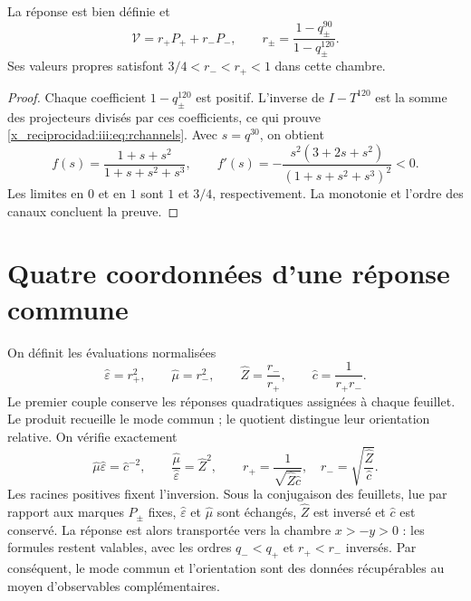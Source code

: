 \begin{proposition}
La réponse est bien définie et
\begin{equation}
 \mathcal V=r_+P_++r_-P_-,\qquad
 r_\pm=\frac{1-q_\pm^{90}}{1-q_\pm^{120}}.
 \label{x_reciprocidad:iii:eq:rchannels}
\end{equation}
Ses valeurs propres satisfont $3/4<r_-<r_+<1$ dans cette chambre.
\end{proposition}
\begin{proof}
Chaque coefficient $1-q_\pm^{120}$ est positif. L'inverse de $I-T^{120}$ est la somme des projecteurs divisés par ces coefficients, ce qui prouve \eqref{x_reciprocidad:iii:eq:rchannels}. Avec $s=q^{30}$, on obtient
\begin{equation}
 f(s)=\frac{1+s+s^2}{1+s+s^2+s^3},\qquad
 f'(s)=-\frac{s^2(3+2s+s^2)}{(1+s+s^2+s^3)^2}<0.
 \label{x_reciprocidad:iii:eq:monotone}
\end{equation}
Les limites en $0$ et en $1$ sont $1$ et $3/4$, respectivement. La monotonie
et l’ordre des canaux concluent la preuve.
\end{proof}

\section{Quatre coordonnées d’une réponse commune}

On définit les évaluations normalisées
\begin{equation}
 \widehat\varepsilon=r_+^2,\qquad
 \widehat\mu=r_-^2,\qquad
 \widehat Z=\frac{r_-}{r_+},\qquad
 \widehat c=\frac1{r_+r_-}.
 \label{x_reciprocidad:iii:eq:four}
\end{equation}
Le premier couple conserve les réponses quadratiques assignées à chaque feuillet.
Le produit recueille le mode commun ; le quotient distingue leur orientation relative.
On vérifie exactement
\begin{equation}
 \widehat\mu\widehat\varepsilon=\widehat c^{-2},\qquad
 \frac{\widehat\mu}{\widehat\varepsilon}=\widehat Z^2,
 \qquad
 r_+=\frac1{\sqrt{\widehat Z\widehat c}},\quad
 r_-=\sqrt{\frac{\widehat Z}{\widehat c}}.
 \label{x_reciprocidad:iii:eq:four-identities}
\end{equation}
Les racines positives fixent l'inversion. Sous la conjugaison des feuillets, lue par rapport aux marques $P_\pm$ fixes, $\widehat\varepsilon$ et $\widehat\mu$ sont échangés, $\widehat Z$ est inversé et $\widehat c$ est conservé. La réponse est alors transportée vers la chambre $x>-y>0$ : les formules restent valables, avec les ordres $q_-<q_+$ et $r_+<r_-$ inversés. Par conséquent, le mode commun et l'orientation sont des données récupérables au moyen d'observables complémentaires.

